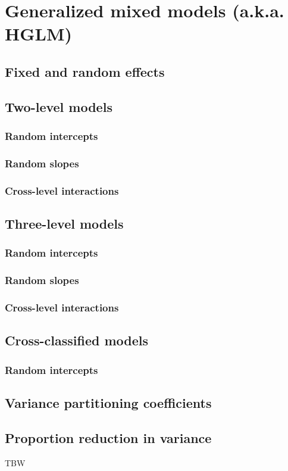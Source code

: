 \chapter{Generalized mixed models (a.k.a. HGLM)}
\section{Fixed and random effects}
\section{Two-level models}
\subsection{Random intercepts}
\subsection{Random slopes}
\subsection{Cross-level interactions}

\section{Three-level models}
\subsection{Random intercepts}
\subsection{Random slopes}
\subsection{Cross-level interactions}

\section{Cross-classified models}
\subsection{Random intercepts}

\section{Variance partitioning coefficients}
\section{Proportion reduction in variance}

TBW

